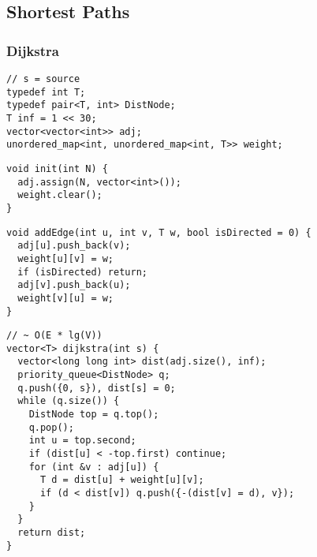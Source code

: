 \documentclass[twoside]{article}
\begin{document}
\begin{multicols*}{2}
{
\subsection*{Shortest Paths}
}
{
\subsubsection*{Dijkstra}
}
\begin{verbatim}
// s = source
typedef int T;
typedef pair<T, int> DistNode;
T inf = 1 << 30;
vector<vector<int>> adj;
unordered_map<int, unordered_map<int, T>> weight;
\end{verbatim}
\vspace{-12pt}
\begin{verbatim}
void init(int N) {
  adj.assign(N, vector<int>());
  weight.clear();
}
\end{verbatim}
\vspace{-12pt}
\begin{verbatim}
void addEdge(int u, int v, T w, bool isDirected = 0) {
  adj[u].push_back(v);
  weight[u][v] = w;
  if (isDirected) return;
  adj[v].push_back(u);
  weight[v][u] = w;
}
\end{verbatim}
\vspace{-12pt}
\begin{verbatim}
// ~ O(E * lg(V))
vector<T> dijkstra(int s) {
  vector<long long int> dist(adj.size(), inf);
  priority_queue<DistNode> q;
  q.push({0, s}), dist[s] = 0;
  while (q.size()) {
    DistNode top = q.top();
    q.pop();
    int u = top.second;
    if (dist[u] < -top.first) continue;
    for (int &v : adj[u]) {
      T d = dist[u] + weight[u][v];
      if (d < dist[v]) q.push({-(dist[v] = d), v});
    }
  }
  return dist;
}
\end{verbatim}

\end{multicols*}
\end{document}
